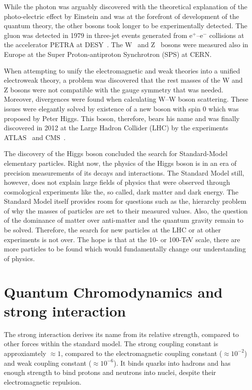 While the photon was arguably discovered with the theoretical explanation of the photo-electric effect by Einstein and was at the forefront of development of the quantum theory, the other bosons took longer to be experimentally detected. The gluon was detected in 1979 in three-jet events generated from e$^+$--e$^-$ collisions at the accelerator PETRA at DESY~\cite{gluons}\@. The W~\cite{WBosonUA1,WBosonUA2} and Z~\cite{ZDiscovery} bosons were measured also in Europe at the Super Proton-antiproton Synchrotron (SPS) at CERN\@.

When attempting to unify the electromagnetic and weak theories into a unified electroweak theory, a problem was discovered that the rest masses of the W and Z bosons were not compatible with the gauge symmetry that was needed. Moreover, divergences were found when calculating W--W boson scattering. These issues were elegantly solved by existence of a new boson with spin 0 which was proposed by Peter Higgs. This boson, therefore, bears his name and was finally discovered in 2012 at the Large Hadron Collider (LHC) by the experiments ATLAS~\cite{HiggsAtlas} and CMS~\cite{HiggsCMS}\@. 

The discovery of the Higgs boson concluded the search for Standard-Model elementary particles. Right now, the physics of the Higgs boson is in an era of precision measurements of its decays and interactions. The Standard Model still, however, does not explain large fields of physics that were observed through cosmological experiments like the, so called, dark matter and dark energy. The Standard Model itself provides room for questions such as the, hierarchy problem of why the masses of particles are set to their measured values. Also, the question of the dominance of matter over anti-matter and the quantum gravity remain to be solved. Therefore, the search for  new particles at the LHC or at other experiments is not over. The hope is that at the 10- or 100-TeV scale, there are more particles to be found which would fundamentally change our understanding of physics. 





\section{\label{QCD}Quantum Chromodynamics and strong interaction}
The strong interaction derives its name from its relative strength, compared to other forces within the standard model. The strong coupling constant is approxiamtely $\approx 1$, compared to the electromagnetic coupling constant ($\approx 10^{-2}$) and weak coupling constant ($\approx 10^{-6}$)\@. It binds quarks into hadrons and has enough strength to bind protons and neutrons into nuclei, despite their electromagnetic repulsion.


